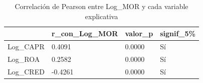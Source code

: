 \begin{table}[htbp]
\centering
\caption{Correlación de Pearson entre Log_MOR y cada variable explicativa}
\begin{tabular}{llll}
\hline
 & r\_con\_Log\_MOR & valor\_p & signif\_5\% \\
\hline
Log\_CAPR & 0.4091 & 0.0000 & Sí \\
Log\_ROA & 0.2582 & 0.0000 & Sí \\
Log\_CRED & -0.4261 & 0.0000 & Sí \\
\hline
\end{tabular}
\label{tab:tabla3_correlaciones}
\end{table}